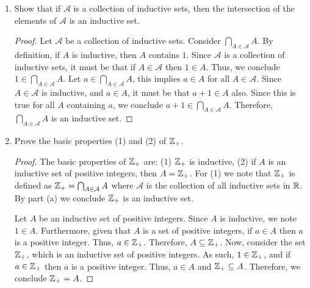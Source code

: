 \documentclass[12pt]{article}
\begin{document}
	\begin{enumerate}[label=(\alph*)]
		\item Show that if $\mathcal{A}$ is a collection of inductive sets, then the intersection of the
		elements of $\mathcal{A}$ is an inductive set.
		\begin{proof}
			Let $\mathcal{A}$ be a collection of inductive sets. Consider $\bigcap_{A \in \mathcal{A}} A$.
			By definition, if $A$ is inductive, then $A$ contains $1$. Since $\mathcal{A}$ is a collection
			of inductive sets, it must be that if $A \in \mathcal{A}$ then $1 \in A$. Thus, we conclude
			$1 \in \bigcap_{A \in \mathcal{A}} A$. Let $a \in \bigcap_{A \in \mathcal{A}} A$, this
			implies $a \in A$ for all $A \in \mathcal{A}$. Since $A \in \mathcal{A}$ is inductive,
			and $a \in A$, it must be that $a + 1 \in A$ also. Since this is true for all $A$ containing
			$a$, we conclude $a+1 \in \bigcap_{A \in \mathcal{A}} A$. Therefore, $\bigcap_{A \in \mathcal{A}} A$
			is an inductive set.  
		\end{proof}
		\item Prove the basic properties (1) and (2) of $\mathbb{Z}_+$.
		\begin{proof}
			The basic properties of $\mathbb{Z}_{+}$ are: (1) $\mathbb{Z}_{+}$ is inductive, (2) if $A$ is an inductive set
			of positive integers, then $A = \mathbb{Z}_{+}$. For (1) we note that $\mathbb{Z}_{+}$ is defined as 
			$\mathbb{Z}_{+} = \bigcap_{A \in \mathcal{A}} A$ where $\mathcal{A}$ is the collection of all 
			inductive sets in $\mathbb{R}$. By part (a) we conclude $\mathbb{Z}_{+}$ is an inductive set.
			
			Let $A$ be an inductive set of positive integers. Since $A$ is inductive, we note $1 \in A$.
			Furthermore, given that $A$ is a set of positive integers, if $a \in A$ then $a$ is a positive
			integer. Thus, $a \in \mathbb{Z}_{+}$. Therefore, $A \subseteq \mathbb{Z}_{+}$. Now, consider the 
			set $\mathbb{Z}_{+}$, which is an inductive set of positive integers. As such, $1 \in \mathbb{Z}_{+}$, and 
			if $a \in \mathbb{Z}_{+}$ then $a$ is a positive integer. Thus, $a \in A$ and $\mathbb{Z}_{+} \subseteq A$.
			Therefore, we conclude $\mathbb{Z}_{+} = A$.
		\end{proof}
	\end{enumerate}
	
\end{document}
